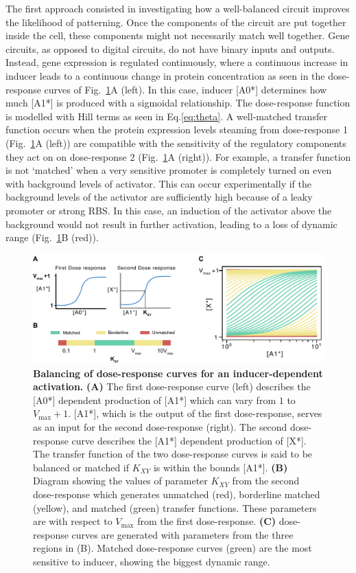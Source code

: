 The first approach consisted in investigating how a well-balanced circuit improves the likelihood of patterning.
Once the components of the circuit are put together inside the cell,
these components might not necessarily match well together.
Gene circuits, as opposed to digital circuits, do not have binary inputs and outputs.
Instead, gene expression is regulated continuously,
where a continuous increase in inducer leads to a continuous change in protein concentration
as seen in the dose-response curves of Fig.~\ref{fig:balancing}A
(left).
In this case, inducer [A0*] determines how much [A1*] is produced with a sigmoidal relationship.
The dose-response function is modelled with Hill terms as seen in Eq.\ref{eq:theta}.
A well-matched transfer function occurs when the protein expression levels steaming from dose-response 1
(Fig.~\ref{fig:balancing}A (left))
are compatible with the sensitivity of the regulatory components they act on on dose-response 2
(Fig.~\ref{fig:balancing}A (right)).
For example, a transfer function is not ‘matched’
when a very sensitive promoter is completely turned on even with background levels of activator.
This can occur experimentally
if the background levels of the activator are sufficiently high because of a leaky promoter or strong RBS.
In this case, an induction of the activator above the background would not result in further activation,
leading to a loss of dynamic range (Fig.~\ref{fig:balancing}B (red)).


\begin{figure}[H]
    \centering
    \includegraphics[width=1\textwidth]{chapters/Chapter 2/balancing}
    \caption{\textbf{Balancing of dose-response curves for an inducer-dependent activation.} \textbf{(A)} The first dose-response curve (left) describes the [A0*] dependent production of [A1*] which can vary from $1$ to $V_{\max}+1 $. [A1*], which is the output of the first dose-response, serves as an input for the second dose-response (right). The second dose-response curve describes the [A1*] dependent production of [X*]. The transfer function of the two dose-response curves is said to be balanced or matched if $K_{XY}$ is within the bounds [A1*]. \textbf{(B)} Diagram showing the values of parameter $K_{XY}$ from the second dose-response which generates unmatched (red), borderline matched (yellow), and matched (green) transfer functions. These parameters are with respect to $V_{\max}$ from the first dose-response. \textbf{(C)} dose-response curves are generated with parameters from the three regions in (B). Matched dose-response curves (green) are the most sensitive to inducer, showing the biggest dynamic range.}
    \label{fig:balancing}
\end{figure}


